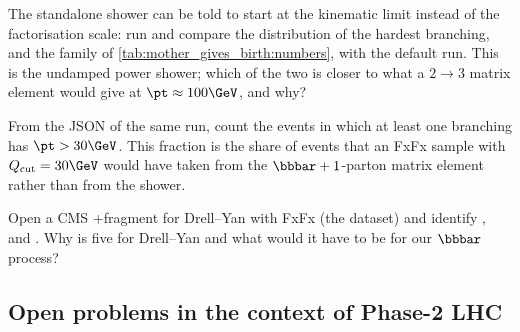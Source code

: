 \begin{exercises}
\item The standalone shower can be told to start at the kinematic limit
  instead of the factorisation scale: run
   and
  compare the \pt distribution of the hardest branching, and the family
  \pt of \cref{tab:mother_gives_birth:numbers}, with the default run. This
  is the undamped power shower; which of the two is closer to what a
  $2\to3$ matrix element would give at $\pt\approx100\GeV$, and why?
\item From the  JSON of the same run, count the events in
  which at least one branching has $\pt>30\GeV$. This fraction is the share
  of events that an FxFx sample with $Q_{\mathrm{cut}}=30\GeV$ would have
  taken from the $\bbbar+1$-parton matrix element rather than from the
  shower.
\item Open a CMS \MG+\PYTHIA fragment for Drell--Yan with FxFx (the
   dataset) and
  identify ,  and
  . Why is  five for Drell--Yan and
  what would it have to be for our $\bbbar$ process?
\end{exercises}

\subsection*{Open problems in the context of Phase-2 LHC}
\label{sec:whose_child:open_problems}

